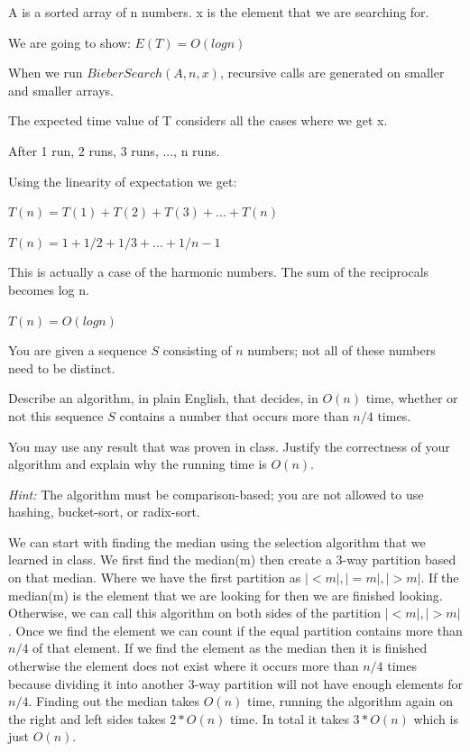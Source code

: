 \documentclass[12pt]{article}
\newcounter{ques}
\newenvironment{question}{\stepcounter{ques}{\noindent\bf Question \arabic{ques}:}}{\vspace{5mm}}
\newenvironment{solution}{{\noindent\bf Solution:}}{\vspace{5mm}}
\begin{document}
\begin{solution}
      
      A is a sorted array of n numbers. x is the element that we are searching for.

      We are going to show: $E(T) = O(log n)$

      When we run $BieberSearch(A,n,x)$, recursive calls are generated on smaller and smaller arrays.

      The expected time value of T considers all the cases where we get x.

      After 1 run, 2 runs, 3 runs, ..., n runs.

      Using the linearity of expectation we get:

      $T(n) = T(1) + T(2) + T(3) + ... + T(n)$

      $T(n) = 1 + 1/2 + 1/3 + ... + 1/n-1$

      This is actually a case of the harmonic numbers. The sum of the reciprocals becomes log n.

      $T(n) = O(logn)$

\end{solution}


\begin{question}
You are given a sequence $S$ consisting of $n$ numbers; not all of these 
numbers need to be distinct. 

Describe an algorithm, in plain English, that decides, in $O(n)$ time, 
whether or not this sequence $S$ contains a number that occurs more 
than $n/4$ times. 

You may use any result that was proven in class. Justify the correctness
of your algorithm and explain why the running time is $O(n)$. 

\noindent \emph{Hint:} The algorithm must be comparison-based; you are
not allowed to use hashing, bucket-sort, or radix-sort. 
\end{question}

\begin{solution}
    We can start with finding the median using the selection algorithm that we learned in class.
    We first find the median(m) then create a 3-way partition based on that median. Where we have the first partition as
    $|<m|, |=m|, |>m|$.
    If the median(m) is the element that we are looking for then we are finished looking.
    Otherwise, we can call this algorithm on both sides of the partition $|<m|, |>m|$.
    Once we find the element we can count if the equal partition contains more than $n/4$ of that element.
    If we find the element as the median then it is finished otherwise the element does not exist where it occurs more than $n/4$ times
    because dividing it into another 3-way partition will not have enough elements for $n/4$.
    Finding out the median takes $O(n)$ time, running the algorithm again on the right and left sides takes $2 * O(n)$ time.
    In total it takes $3*O(n)$ which is just $O(n)$.
    
\end{solution}
\end{document}
